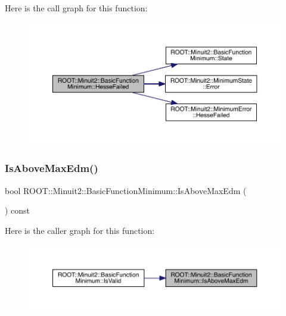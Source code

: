 Here is the call graph for this function\+:
\nopagebreak
\begin{figure}[H]
\begin{center}
\leavevmode
\includegraphics[width=350pt]{de/d25/classROOT_1_1Minuit2_1_1BasicFunctionMinimum_a8bcb47393d7e39ec1c8fda42974d092f_cgraph}
\end{center}
\end{figure}
\mbox{\label{classROOT_1_1Minuit2_1_1BasicFunctionMinimum_a6c37206680e19443048e8b398ef5ced8}} 
\subsubsection{\texorpdfstring{IsAboveMaxEdm()}{IsAboveMaxEdm()}\hspace{0.1cm}{\footnotesize\ttfamily [1/2]}}
{\footnotesize\ttfamily bool R\+O\+O\+T\+::\+Minuit2\+::\+Basic\+Function\+Minimum\+::\+Is\+Above\+Max\+Edm (\begin{DoxyParamCaption}{ }\end{DoxyParamCaption}) const\hspace{0.3cm}{\ttfamily [inline]}}

Here is the caller graph for this function\+:\nopagebreak
\begin{figure}[H]
\begin{center}
\leavevmode
\includegraphics[width=350pt]{de/d25/classROOT_1_1Minuit2_1_1BasicFunctionMinimum_a6c37206680e19443048e8b398ef5ced8_icgraph}
\end{center}
\end{figure}
\mbox{\label{classROOT_1_1Minuit2_1_1BasicFunctionMinimum_a6c37206680e19443048e8b398ef5ced8}} 
